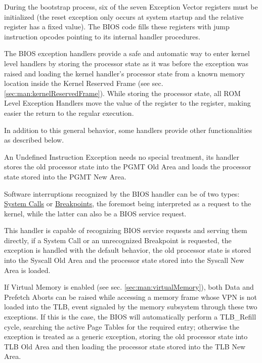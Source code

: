 \label{sec:man:romExceptionHandlers}

During the bootstrap process, six of the seven Exception Vector registers must be initialized (the reset exception only occurs at system startup and the relative register has a fixed value).
The BIOS code fills these registers with jump instruction opcodes pointing to its internal handler procedures.

The BIOS exception handlers provide a safe and automatic way to enter kernel level handlers by storing the processor state as it was before the exception was raised and loading the kernel handler's processor state from a known memory location inside the Kernel Reserved Frame (see sec. \ref{sec:man:kernelReservedFrame}).
While storing the processor state, all ROM Level Exception Handlers move the value of the  register to the  register, making easier the return to the regular execution.

In addition to this general behavior, some handlers provide other functionalities as described below.


An Undefined Instruction Exception needs no special treatment, its handler stores the old processor state into the PGMT Old Area and loads the processor state stored into the PGMT New Area.


Software interruptions recognized by the BIOS handler can be of two types: \uline{System Calls} or \uline{Breakpoints}, the foremost being interpreted as a request to the kernel, while the latter can also be a BIOS service request.

This handler is capable of recognizing BIOS service requests and serving them directly, if a System Call or an unrecognized Breakpoint is requested, the exception is handled with the default behavior, the old processor state is stored into the Syscall Old Area and the processor state stored into the Syscall New Area is loaded.


If Virtual Memory is enabled (see sec. \ref{sec:man:virtualMemory}), both Data and Prefetch Aborts can be raised while accessing a memory frame whose VPN is not loaded into the TLB, event signaled by the memory subsystem through these two exceptions.
If this is the case, the BIOS will automatically perform a TLB\_Refill cycle, searching the active Page Tables for the required entry; otherwise the exception is treated as a generic exception, storing the old processor state into TLB Old Area and then loading the processor state stored into the TLB New Area.

